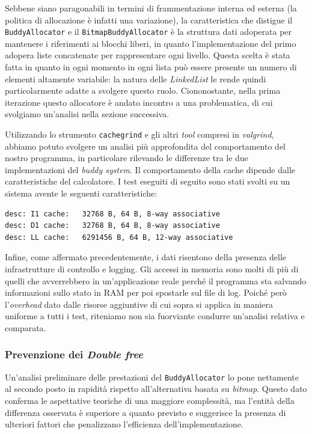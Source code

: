 Sebbene siano paragonabili in termini di frammentazione interna ed esterna (la politica di allocazione è infatti una variazione), la caratteristica che distigue il \texttt{BuddyAllocator} e il \texttt{BitmapBuddyAllocator} è la struttura dati adoperata per mantenere i riferimenti ai blocchi liberi, in quanto l'implementazione del primo adopera liste concatenate per rappresentare ogni livello. Questa scelta è stata fatta in quanto in ogni momento in ogni lista può essere presente un numero di elementi altamente variabile: la natura delle \textit{LinkedList} le rende quindi particolarmente adatte a svolgere questo ruolo. Ciononostante, nella prima iterazione questo allocatore è andato incontro a una problematica, di cui svolgiamo un'analisi nella sezione successiva.

Utilizzando lo strumento \texttt{cachegrind} e gli altri \textit{tool} compresi in \textit{valgrind}, abbiamo potuto svolgere un analisi più approfondita del comportamento del nostro programma, in particolare rilevando le differenze tra le due implementazioni del \textit{buddy system}. Il comportamento della cache dipende dalle caratteristiche del calcolatore. I test eseguiti di seguito sono stati svolti su un sistema avente le seguenti caratteristiche:
\begin{lstlisting}[language={}]
desc: I1 cache:   32768 B, 64 B, 8-way associative
desc: D1 cache:   32768 B, 64 B, 8-way associative
desc: LL cache:   6291456 B, 64 B, 12-way associative
\end{lstlisting}

Infine, come affermato precedentemente, i dati risentono della presenza delle infrastrutture di controllo e logging. Gli accessi in memoria sono molti di più di quelli che avverrebbero in un'applicazione reale perché il programma sta salvando informazioni sullo stato in RAM per poi spostarle sul file di log. Poiché però l'\textit{overhead} dato dalle risorse aggiuntive di cui sopra si applica in maniera uniforme a tutti i test, riteniamo non sia fuorviante condurre un'analisi relativa e comparata.

\subsubsection*{Prevenzione dei \textit{Double free}}
Un'analisi preliminare delle prestazioni del \texttt{BuddyAllocator} lo pone nettamente al secondo posto in rapidità rispetto all'alternativa basata su \textit{bitmap}. Questo dato conferma le aspettative teoriche di una maggiore complessità, ma l'entità della differenza osservata è superiore a quanto previsto e suggerisce la presenza di ulteriori fattori che penalizzano l'efficienza dell'implementazione.

